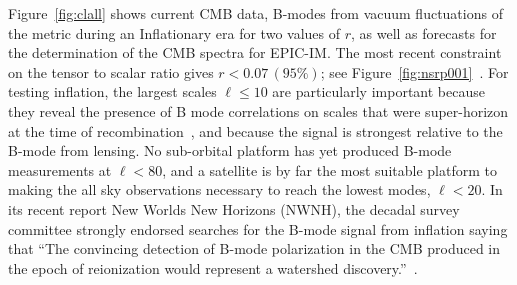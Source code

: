 Figure~\ref{fig:clall} shows current CMB data, B-modes from vacuum fluctuations of the metric during an Inflationary 
era for two values of $r$, as well as forecasts for the determination of the \ac{CMB} spectra for EPIC-IM. 
The most recent constraint on the tensor to scalar ratio gives $r < 0.07 \, (95\%)$; see Figure~\ref{fig:nsrp001}~\cite{Array:2015xqh}. 
For testing inflation, 
the largest scales $\ell \leq 10$ are particularly important because they reveal 
the presence of B mode correlations on scales that were super-horizon at the time of recombination~\cite{Lee:2014cya}, 
and because the signal is strongest relative to the B-mode from lensing. No sub-orbital platform
has yet produced B-mode measurements at $\ell< 80$, and a satellite is by far the most suitable 
platform to making the all sky observations necessary to reach the lowest modes, $\ell<20$. 
In its recent report New Worlds New Horizons (NWNH), the decadal survey committee 
strongly endorsed searches for the B-mode signal from inflation saying that ``The convincing detection of 
B-mode polarization in the CMB produced in the epoch of reionization would represent a watershed discovery.''~\cite{blandford2010}. 
\vspace{-0.1in}
